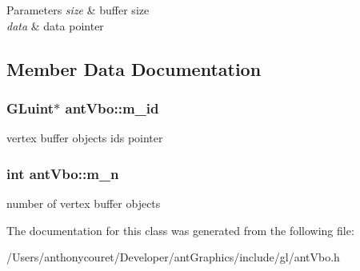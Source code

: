 \begin{DoxyParams}{Parameters}
{\em size} & buffer size \\
\hline
{\em data} & data pointer \\
\hline
\end{DoxyParams}


\subsection{Member Data Documentation}
\hypertarget{classant_vbo_ad9d6ae592ea4f03caf48fd98ce5660c0}{
\subsubsection[{m\+\_\+id}]{\setlength{\rightskip}{0pt plus 5cm}G\+Luint$\ast$ ant\+Vbo\+::m\+\_\+id\hspace{0.3cm}{\ttfamily [private]}}}\label{classant_vbo_ad9d6ae592ea4f03caf48fd98ce5660c0}
vertex buffer objects ids pointer \hypertarget{classant_vbo_aa470c365da54128248ff3cf82a13bb1d}{
\subsubsection[{m\+\_\+n}]{\setlength{\rightskip}{0pt plus 5cm}int ant\+Vbo\+::m\+\_\+n\hspace{0.3cm}{\ttfamily [private]}}}\label{classant_vbo_aa470c365da54128248ff3cf82a13bb1d}
number of vertex buffer objects 

The documentation for this class was generated from the following file\+:\begin{DoxyCompactItemize}
\item 
/\+Users/anthonycouret/\+Developer/ant\+Graphics/include/gl/ant\+Vbo.\+h\end{DoxyCompactItemize}
